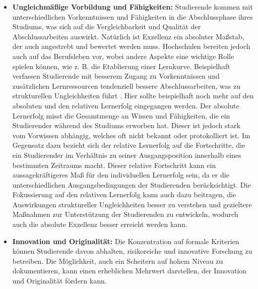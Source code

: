 \documentclass[conference]{IEEEtran}
\begin{document}
\begin{itemize}[leftmargin=*]
    \item \textbf{Ungleichmäßige Vorbildung und Fähigkeiten:}
    \newline Studierende kommen mit unterschiedlichen Vorkenntnissen und Fähigkeiten in die Abschlussphase ihres Studiums, was sich auf die Vergleichbarkeit und Qualität der Abschlussarbeiten auswirkt. Natürlich ist Exzellenz ein absoluter Maßstab, der auch angestrebt und bewertet werden muss. Hochschulen bereiten jedoch auch auf das Berufsleben vor, wobei andere Aspekte eine wichtige Rolle spielen können, wie z. B. die Etablierung einer Lernkurve.
    Beispielhaft verfassen Studierende mit besserem Zugang zu Vorkenntnissen und zusätzlichen Lernressourcen tendenziell bessere Abschlussarbeiten, was zu strukturellen Ungleichheiten führt \cite{Evaluating2022}. Hier sollte beispielhaft noch mehr auf den absoluten und den relativen Lernerfolg eingegangen werden. 
    Der absolute Lernerfolg misst die Gesamtmenge an Wissen und Fähigkeiten, die ein Studierender während des Studiums erworben hat. Dieser ist jedoch stark vom Vorwissen abhängig, welches oft nicht bekannt oder protokolliert ist. Im Gegensatz dazu bezieht sich der relative Lernerfolg auf die Fortschritte, die ein Studierender im Verhältnis zu seiner Ausgangsposition innerhalb eines bestimmten Zeitraums macht. Dieser relative Fortschritt kann ein aussagekräftigeres Maß für den individuellen Lernerfolg sein, da er die unterschiedlichen Ausgangsbedingungen der Studierenden berücksichtigt. Die Fokussierung auf den relativen Lernerfolg kann auch dazu beitragen, die Auswirkungen struktureller Ungleichheiten besser zu verstehen und gezieltere Maßnahmen zur Unterstützung der Studierenden zu entwickeln, wodurch auch die absolute Exzellenz besser erreicht werden kann.

    \item \textbf{Innovation und Originalität:}
    \newline Die Konzentration auf formale Kriterien können Studierende davon abhalten, risikoreiche und innovative Forschung zu betreiben. Die Möglichkeit, auch ein Scheitern auf hohem Niveau zu dokumentieren, kann einen erheblichen Mehrwert darstellen, der Innovation und Originalität fördern kann.
\end{itemize}
\end{document}
